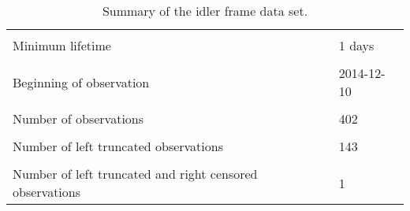 \begin{table}
\centering
\caption{\label{tab:idler-frame-summary}Summary of the idler frame data set.}
\centering
\begin{tabular}[t]{ll}
\toprule
\cellcolor{gray!10}{Maximum lifetime} & \cellcolor{gray!10}{2167 days}\\
Minimum lifetime & 1 days\\
\cellcolor{gray!10}{Maximum fully observed lifetime} & \cellcolor{gray!10}{1461 days}\\
Beginning of observation & 2014-12-10\\
\cellcolor{gray!10}{End of observation} & \cellcolor{gray!10}{2020-11-15}\\
\addlinespace
Number of observations & 402\\
\cellcolor{gray!10}{Number of unique frames} & \cellcolor{gray!10}{143}\\
Number of left truncated observations & 143\\
\cellcolor{gray!10}{Number of right censored observations} & \cellcolor{gray!10}{144}\\
Number of left truncated and right censored observations & 1\\
\bottomrule
\end{tabular}
\end{table}
